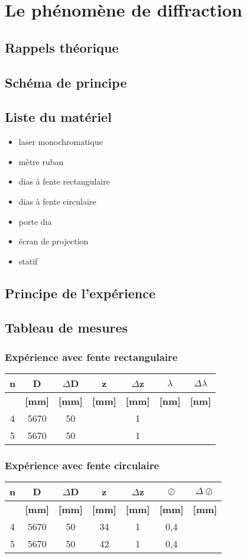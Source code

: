 \documentclass[11pt,a4paper]{report}
\begin{document}
\tableofcontents
\chapter{Le phénomène de diffraction}
	\section{Rappels théorique}
	\section{Schéma de principe}
	\section{Liste du matériel}
	\begin{itemize}
	\item laser monochromatique
	\item mètre ruban
	\item dias à fente rectangulaire
	\item dias à fente circulaire
	\item porte dia
	\item écran de projection
	\item statif
	\end{itemize}
	\section{Principe de l'expérience}
	\section{Tableau de mesures}
	\subsection{Expérience avec fente rectangulaire}
	\begin{tabular}{|c|c|c|c|c|c|c|}
		\hline
		\bf n & \bf D & \bf $\Delta$D & \bf z & \bf $\Delta$z & \bf $\lambda$& \bf $\Delta\lambda$ \\
		\hline
		 & \bf [mm] & \bf [mm] & \bf [mm] & \bf [mm] & \bf [nm]  & \bf [nm] \\
		\hline
		4 & 5670 & 50 &  &  1 &&  \\
		5 & 5670 & 50 &  &  1 && \\
		\hline
	\end{tabular}
	\subsection{Expérience avec fente circulaire}
	\begin{tabular}{|c|c|c|c|c|c|c|}
		\hline
		\bf n & \bf D & \bf $\Delta$D & \bf z & \bf $\Delta$z & \bf $\oslash$& \bf $\Delta\oslash$ \\
		\hline
		 & \bf [mm] & \bf [mm] & \bf [mm] & \bf [mm] & \bf [mm]  & \bf [mm] \\
		\hline
		4 & 5670 & 50 & 34&  1 &0,4&  \\
		5 & 5670 & 50 & 42&  1 &0,4& \\
		\hline
	\end{tabular}
\end{document}
